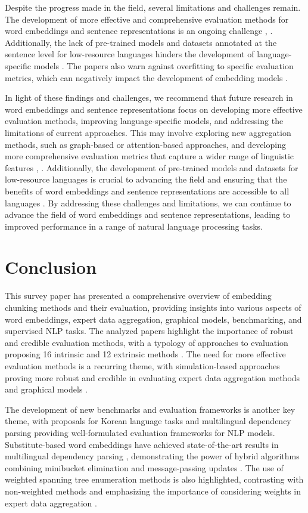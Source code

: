 \documentclass[conference]{IEEEtran}
\begin{document}
Despite the progress made in the field, several limitations and challenges remain. The development of more effective and comprehensive evaluation methods for word embeddings and sentence representations is an ongoing challenge \cite{b1}, \cite{b2}. Additionally, the lack of pre-trained models and datasets annotated at the sentence level for low-resource languages hinders the development of language-specific models \cite{b5}. The papers also warn against overfitting to specific evaluation metrics, which can negatively impact the development of embedding models \cite{b3}.

In light of these findings and challenges, we recommend that future research in word embeddings and sentence representations focus on developing more effective evaluation methods, improving language-specific models, and addressing the limitations of current approaches. This may involve exploring new aggregation methods, such as graph-based or attention-based approaches, and developing more comprehensive evaluation metrics that capture a wider range of linguistic features \cite{b1}, \cite{b4}. Additionally, the development of pre-trained models and datasets for low-resource languages is crucial to advancing the field and ensuring that the benefits of word embeddings and sentence representations are accessible to all languages \cite{b5}. By addressing these challenges and limitations, we can continue to advance the field of word embeddings and sentence representations, leading to improved performance in a range of natural language processing tasks.

\section{Conclusion}
This survey paper has presented a comprehensive overview of embedding chunking methods and their evaluation, providing insights into various aspects of word embeddings, expert data aggregation, graphical models, benchmarking, and supervised NLP tasks. The analyzed papers highlight the importance of robust and credible evaluation methods, with a typology of approaches to evaluation proposing 16 intrinsic and 12 extrinsic methods \cite{b1}. The need for more effective evaluation methods is a recurring theme, with simulation-based approaches proving more robust and credible in evaluating expert data aggregation methods \cite{b2} and graphical models \cite{b3}. 

The development of new benchmarks and evaluation frameworks is another key theme, with proposals for Korean language tasks \cite{b4} and multilingual dependency parsing \cite{b5} providing well-formulated evaluation frameworks for NLP models. Substitute-based word embeddings have achieved state-of-the-art results in multilingual dependency parsing \cite{b5}, demonstrating the power of hybrid algorithms combining minibucket elimination and message-passing updates \cite{b3}. The use of weighted spanning tree enumeration methods is also highlighted, contrasting with non-weighted methods and emphasizing the importance of considering weights in expert data aggregation \cite{b2}.
\end{document}
